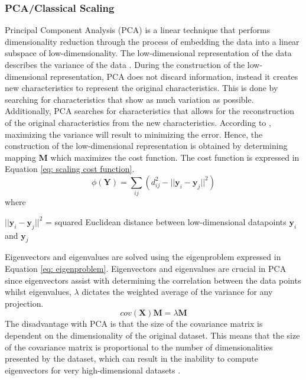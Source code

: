 \documentclass[11pt,twocolumn]{witseiepaper}
\begin{document}
	\subsubsection{PCA/Classical Scaling}
	Principal Component Analysis (PCA) is a linear technique that performs dimensionality reduction through the process of embedding the data into a linear subspace of low-dimensionality. The low-dimensional representation of the data describes the variance of the data \cite{Jolliffe2016}. During the construction of the low-dimensional representation, PCA does not discard information, instead it creates new characteristics to represent the original characteristics. This is done by searching for characteristics that show as much variation as possible. Additionally, PCA searches for characteristics that allows for the reconstruction of the original characteristics from the new characteristics. According to \cite{van2009dimensionality}, maximizing the variance will result to minimizing the error. Hence, the construction of the low-dimensional representation is obtained by determining mapping  \textbf{M} which maximizes the cost function. The cost function is expressed in Equation \ref{eq: scaling cost function}.
		\begin{equation}
	\phi(\textbf{Y}) = \sum_{ij}(d_{ij}^{2} - ||\textbf{y}_i - \textbf{y}_j||^2)
	\label{eq: scaling cost function}
	\end{equation}
	where 
	
	$||\textbf{y}_i - \textbf{y}_j ||^{2}$ = squared Euclidean distance between low-dimensional datapoints $\textbf{y}_i$ and $\textbf{y}_j$
	
	Eigenvectors and eigenvalues are solved using the eigenproblem expressed in Equation \ref{eq: eigenproblem}. Eigenvectors and eigenvalues are crucial in PCA since eigenvectors assist with determining the correlation between the data points whilst eigenvalues, $\lambda$ dictates the weighted average of the variance for any projection.
	\begin{equation}
		cov(\textbf{X})\textbf{M} = \lambda\textbf{M}
		\label{eq: eigenproblem}
	\end{equation}
	The disadvantage with PCA is that the size of the covariance matrix is dependent on the dimensionality of the original dataset. This means that the size of the covariance matrix is proportional to the number of dimensionalities presented by the dataset, which can result in the inability to compute eigenvectors for very high-dimensional datasets \cite{van2009dimensionality}.
	
\end{document}
